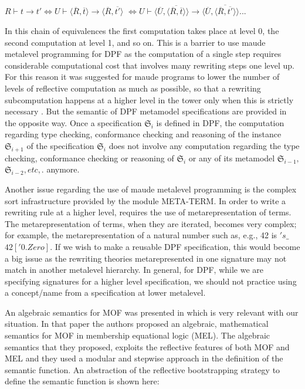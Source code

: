 \documentclass{eceasst}
\begin{document}
\begin{center}
$R \vdash t \rightarrow t' \Leftrightarrow U \vdash \langle \overline{R}, \overline{t} \rangle \rightarrow \langle \overline{R}, \overline{t'} \rangle $
 $\Leftrightarrow U \vdash \langle \overline{U}, \overline{ \langle \overline{R}, \overline{t} \rangle } \rangle \rightarrow \langle \overline{U}, \overline{\langle \overline{R}, \overline{t'} \rangle } \rangle  ...$
\end{center}

In this chain of equivalences the first computation takes place at level 0, the second computation at level 1, and so on. 
This is a barrier to use maude metalevel programming for DPF as the computation of a single step requires considerable computational cost that involves many rewriting steps one level up. 
For this reason it was suggested for maude programs to lower the number of levels of reflective computation as much as possible, so that a rewriting 
subcomputation happens at a higher level in the tower only when this is strictly necessary \cite{Clavel2007}.
But the semantic of DPF metamodel specifications are provided in the opposite way. 
Once a specification $\mathfrak{S}_i$ is defined in DPF, the computation regarding type checking, conformance checking and reasoning of 
the instance $\mathfrak{S}_{i+1}$ of the specification $\mathfrak{S}_i$ does not involve any computation regarding the type checking, conformance checking or reasoning of 
$\mathfrak{S}_i$ or any of its metamodel $\mathfrak{S}_{i-1},$ $\mathfrak{S}_{i-2}, etc,.$ anymore. 

Another issue regarding the use of maude metalevel programming is the complex sort infrastructure provided by the module META-TERM. 
In order to write a rewriting rule at a higher level, requires the use of metarepresentation of terms. 
The metarepresentation of terms, when they are iterated, becomes very complex; for example, the metarepresentation of a natural number such as, e.g., 42 is $'s\_$ $\hat{}$  $42['0.Zero]$. 
If we wish to make a reusable DPF specification, this would become a big issue as the rewriting theories metarepresented in one signature may not match in another metalevel hierarchy. 
In general, for DPF, while we are specifying signatures for a higher level specification, we should not practice using a concept/name from a specification at lower metalevel. 

An algebraic semantics for MOF was presented in \cite{BoronatM10} which is very relevant with our situation. 
In that paper the authors proposed an algebraic, mathematical semantics for MOF in membership equational logic (MEL).
The algebraic semantics that they proposed, exploits the reflective features of both MOF and MEL and they used a modular and stepwise approach in the definition of the semantic function. 
An abstraction of the reflective bootstrapping strategy to define the semantic function is shown here:
\end{document}
